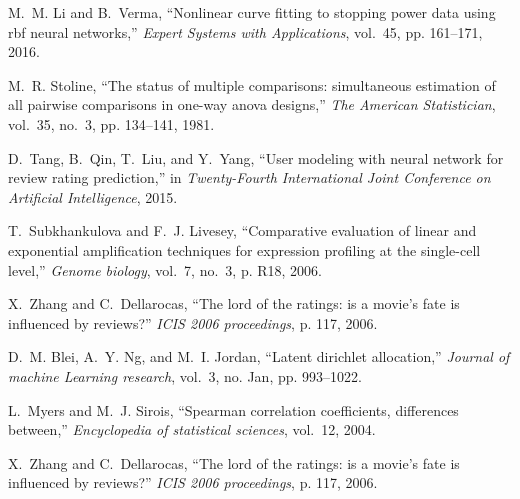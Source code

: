 \documentclass{mcmthesis}
\begin{document}
\begin{thebibliography}{99}

M.~M. Li and B.~Verma, ``Nonlinear curve fitting to stopping power data using
  rbf neural networks,'' \emph{Expert Systems with Applications}, vol.~45, pp.
  161--171, 2016.
  
  
M.~R. Stoline, ``The status of multiple comparisons: simultaneous estimation of
  all pairwise comparisons in one-way anova designs,'' \emph{The American
  Statistician}, vol.~35, no.~3, pp. 134--141, 1981.

D.~Tang, B.~Qin, T.~Liu, and Y.~Yang, ``User modeling with neural network for
  review rating prediction,'' in \emph{Twenty-Fourth International Joint
  Conference on Artificial Intelligence}, 2015.
  
T.~Subkhankulova and F.~J. Livesey, ``Comparative evaluation of linear and
  exponential amplification techniques for expression profiling at the
  single-cell level,'' \emph{Genome biology}, vol.~7, no.~3, p. R18, 2006. 

X.~Zhang and C.~Dellarocas, ``The lord of the ratings: is a movie's fate is
  influenced by reviews?'' \emph{ICIS 2006 proceedings}, p. 117, 2006.
  
D.~M. Blei, A.~Y. Ng, and M.~I. Jordan, ``Latent dirichlet allocation,''
  \emph{Journal of machine Learning research}, vol.~3, no. Jan, pp. 993--1022.
  
L.~Myers and M.~J. Sirois, ``Spearman correlation coefficients, differences
  between,'' \emph{Encyclopedia of statistical sciences}, vol.~12, 2004.
  
X.~Zhang and C.~Dellarocas, ``The lord of the ratings: is a movie's fate is
  influenced by reviews?'' \emph{ICIS 2006 proceedings}, p. 117, 2006.
\end{thebibliography}
\end{document}
